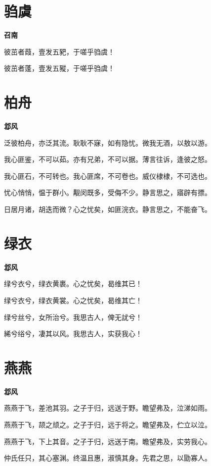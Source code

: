 \documentclass[12pt,a4paper]{ctexbook}
\begin{document}
\section{驺虞}
\textbf{召南}\par\vspace{0.5em}
彼茁者葭，壹发五豝，于嗟乎驺虞！\par
彼茁者蓬，壹发五豵，于嗟乎驺虞！\par

\section{柏舟}
\textbf{邶风}\par\vspace{0.5em}
泛彼柏舟，亦泛其流。耿耿不寐，如有隐忧。微我无酒，以敖以游。\par
我心匪鉴，不可以茹。亦有兄弟，不可以据。薄言往诉，逢彼之怒。\par
我心匪石，不可转也。我心匪席，不可卷也。威仪棣棣，不可选也。\par
忧心悄悄，愠于群小。觏闵既多，受侮不少。静言思之，寤辟有摽。\par
日居月诸，胡迭而微？心之忧矣，如匪浣衣。静言思之，不能奋飞。\par

\section{绿衣}
\textbf{邶风}\par\vspace{0.5em}
绿兮衣兮，绿衣黄裹。心之忧矣，曷维其已！\par
绿兮衣兮，绿衣黄裳。心之忧矣，曷维其亡！\par
绿兮丝兮，女所治兮。我思古人，俾无訧兮！\par
絺兮绤兮，凄其以风。我思古人，实获我心！\par

\section{燕燕}
\textbf{邶风}\par\vspace{0.5em}
燕燕于飞，差池其羽。之子于归，远送于野。瞻望弗及，泣涕如雨。\par
燕燕于飞，颉之颃之。之子于归，远于将之。瞻望弗及，伫立以泣。\par
燕燕于飞，下上其音。之子于归，远送于南。瞻望弗及，实劳我心。\par
仲氏任只，其心塞渊。终温且惠，淑慎其身。先君之思，以勖寡人。\par
\end{document}
